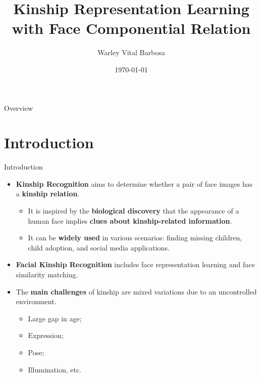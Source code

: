 \documentclass[aspectratio=169,xcolor=dvipsnames]{beamer}
\title[FaCoRNet]{Kinship Representation Learning with Face Componential Relation} %
\author[Barbosa, Warley .V]{Warley Vital Barbosa}
\date{\today} %
\begin{document}
\begin{frame}[plain]
    \titlepage
\end{frame}

\begin{frame}{Overview}
    \tableofcontents
\end{frame}

\section{Introduction}

\begin{frame}{Introduction}
    \begin{itemize} 
        \item \textbf{Kinship Recognition} aims to determine whether a pair of face images has a \textbf{kinship relation}.
            \begin{itemize}
                \item It is inspired by the \textbf{biological discovery} that the appearance of a human face implies \textbf{clues about kinship-related information}.
                \item It can be \textbf{widely used} in various scenarios: finding missing children, child adoption, and social media applications.
            \end{itemize}
            \item \textbf{Facial Kinship Recognition} includes face representation learning and face similarity matching.
            \item The \textbf{main challenges} of kinship are mixed variations due to an uncontrolled environment.
                \begin{itemize}
                    \item Large gap in age;
                    \item Expression;
                    \item Pose;
                    \item Illumination, etc.
                \end{itemize}
    \end{itemize}
\end{frame}
\end{document}
